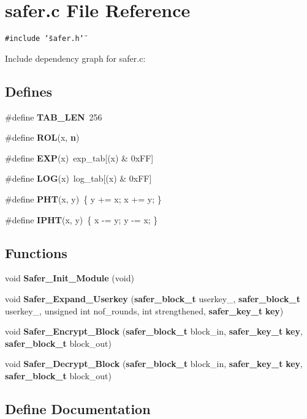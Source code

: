 \section{safer.c File Reference}
\label{safer_8c}


{\tt \#include \char`\"{}safer.h\char`\"{}}\par


Include dependency graph for safer.c:\subsection*{Defines}
\begin{CompactItemize}
\item 
\#define {\bf TAB\_\-LEN}\ 256
\item 
\#define {\bf ROL}(x, {\bf n})
\item 
\#define {\bf EXP}(x)\ exp\_\-tab[(x) \& 0x\-FF]
\item 
\#define {\bf LOG}(x)\ log\_\-tab[(x) \& 0x\-FF]
\item 
\#define {\bf PHT}(x, y)\ \{ y += x; x += y; \}
\item 
\#define {\bf IPHT}(x, y)\ \{ x -= y; y -= x; \}
\end{CompactItemize}
\subsection*{Functions}
\begin{CompactItemize}
\item 
void {\bf Safer\_\-Init\_\-Module} (void)
\item 
void {\bf Safer\_\-Expand\_\-Userkey} ({\bf safer\_\-block\_\-t} userkey\_, {\bf safer\_\-block\_\-t} userkey\_, unsigned int nof\_\-rounds, int strengthened, {\bf safer\_\-key\_\-t} {\bf key})
\item 
void {\bf Safer\_\-Encrypt\_\-Block} ({\bf safer\_\-block\_\-t} block\_\-in, {\bf safer\_\-key\_\-t} {\bf key}, {\bf safer\_\-block\_\-t} block\_\-out)
\item 
void {\bf Safer\_\-Decrypt\_\-Block} ({\bf safer\_\-block\_\-t} block\_\-in, {\bf safer\_\-key\_\-t} {\bf key}, {\bf safer\_\-block\_\-t} block\_\-out)
\end{CompactItemize}


\subsection{Define Documentation}

